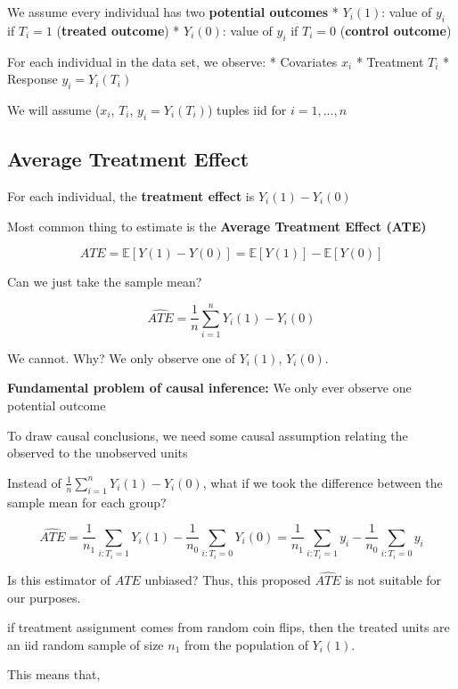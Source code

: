 \documentclass[
  letterpaper,
  DIV=11,
  numbers=noendperiod]{scrreprt}
\begin{document}
We assume every individual has two \textbf{potential outcomes} *
\(Y_{i}(1)\): value of \(y_{i}\) if \(T_{i} = 1\) (\textbf{treated
outcome}) * \(Y_{i}(0)\): value of \(y_{i}\) if \(T_{i} = 0\)
(\textbf{control outcome})

For each individual in the data set, we observe: * Covariates \(x_{i}\)
* Treatment \(T_{i}\) * Response \(y_{i} = Y_{i}(T_{i})\)

We will assume (\(x_{i}\), \(T_{i}\), \(y_{i} = Y_{i}(T_{i})\)) tuples
iid for \(i = 1,..., n\)

\hypertarget{average-treatment-effect}{%
\subsection{Average Treatment Effect}\label{average-treatment-effect}}

For each individual, the \textbf{treatment effect} is
\(Y_{i}(1)-Y_{i}(0)\)

Most common thing to estimate is the \textbf{Average Treatment Effect
(ATE)}

\[ATE = \mathbb{E}[Y(1)-Y(0)] = \mathbb{E}[Y(1)] - \mathbb{E}[Y(0)]\]

Can we just take the sample mean?

\[\hat{ATE} = \frac{1}{n}\sum_{i=1}^{n}Y_{i}(1) - Y_{i}(0)\]

We cannot. Why? We only observe one of \(Y_{i}(1)\), \(Y_{i}(0)\).

\textbf{Fundamental problem of causal inference:} We only ever observe
one potential outcome

To draw causal conclusions, we need some causal assumption relating the
observed to the unobserved units

Instead of \(\frac{1}{n}\sum_{i=1}^{n}Y_{i}(1) - Y_{i}(0)\), what if we
took the difference between the sample mean for each group?

\[\hat{ATE} = \frac{1}{n_{1}}\sum_{i: T_{i} = 1}{Y_{i}(1)} - \frac{1}{n_{0}}\sum_{i: T_{i} = 0}{Y_{i}(0)} = \frac{1}{n_{1}}\sum_{i: T_{i} = 1}{y_{i}} - \frac{1}{n_{0}}\sum_{i: T_{i} = 0}{y_{i}}\]

Is this estimator of \(ATE\) unbiased? Thus, this proposed \(\hat{ATE}\)
is not suitable for our purposes.

if treatment assignment comes from random coin flips, then the treated
units are an iid random sample of size \(n_{1}\) from the population of
\(Y_{i}(1)\).

This means that,
\end{document}
